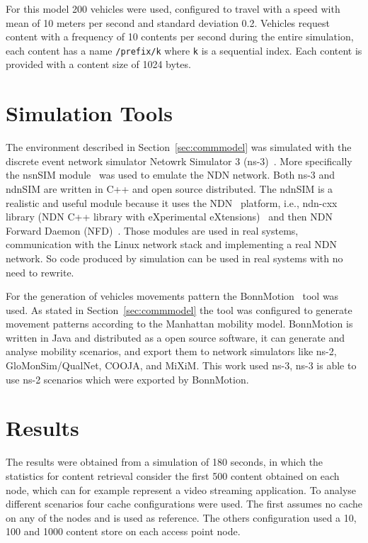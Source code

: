 \documentclass[10pt,a4paper,final]{IEEEtran}
\begin{document}
For this model 200 vehicles were used, configured to travel with a speed with
mean of 10 meters per second and standard deviation 0.2. Vehicles request
content with a frequency of 10 contents per second during the entire simulation,
each content has a name {\tt /prefix/k} where {\tt k} is a sequential index.
Each content is provided with a content size of 1024 bytes.

\section{Simulation Tools}\label{sec:simu}

The environment described in Section~\ref{sec:commmodel} was simulated with the
discrete event network simulator Netowrk Simulator 3 (ns-3)~\cite{ns3web}. More
specifically the nsnSIM module~\cite{mastorakis2015ndnsim} was used to emulate
the NDN network. Both ns-3 and ndnSIM are written in C++ and open source
distributed. The ndnSIM is a realistic and useful module because it uses the
NDN~\cite{zhang2010named} platform, i.e., ndn-cxx library (NDN C++ library with
eXperimental eXtensions)~\cite{ndnp} and then NDN Forward Daemon
(NFD)~\cite{afanasyev2014nfd}. Those modules are used in real systems,
communication with the Linux network stack and implementing a real NDN network.
So code produced by simulation can be used in real systems with no need to
rewrite.

For the generation of vehicles movements pattern the
BonnMotion~\cite{aschenbruck2010bonnmotion} tool was used. As stated in
Section~\ref{sec:commmodel} the tool was configured to generate movement
patterns according to the Manhattan mobility model. BonnMotion is written in
Java and distributed as a open source software, it can generate and analyse
mobility scenarios, and export them to network simulators like ns-2,
GloMonSim/QualNet, COOJA, and MiXiM. This work used ns-3, ns-3 is able to use
ns-2 scenarios which were exported by BonnMotion.

\section{Results}\label{sec:result}

The results were obtained from a simulation of 180 seconds, in which the
statistics for content retrieval consider the first 500 content obtained on
each node, which can for example represent a video streaming application. To
analyse different scenarios four cache configurations were used.  The first
assumes no cache on any of the nodes and is used as reference. The others
configuration used a 10, 100 and 1000 content store on each access point node.
\end{document}
